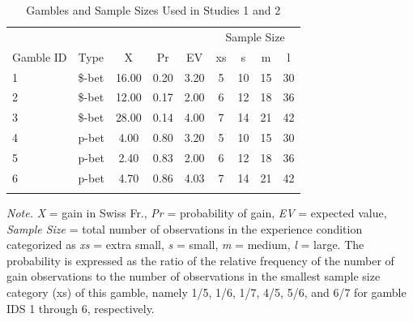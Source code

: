 \documentclass[a4paper, man, natbib, floatsintext]{apa6} %
\begin{document}

\begin{table}[bth]
\begin{center}
\begin{threeparttable}
\caption{Gambles and Sample Sizes Used in Studies 1 and 2\label{table:Lotteries}}
\begin{tabular}{llccccccc}
\toprule
 &  &  &  &  & \multicolumn{4}{c}{Sample Size} \\
\cmidrule(r){6-9}
Gamble ID & Type & X & Pr & EV & xs & s & m & l\\
\midrule
1 & \$-bet & 16.00 & 0.20 & 3.20 & 5 & 10 & 15 & 30\\
2 & \$-bet & 12.00 & 0.17 & 2.00 & 6 & 12 & 18 & 36\\
3 & \$-bet & 28.00 & 0.14 & 4.00 & 7 & 14 & 21 & 42\\
4 & p-bet & 4.00 & 0.80 & 3.20 & 5 & 10 & 15 & 30\\
5 & p-bet & 2.40 & 0.83 & 2.00 & 6 & 12 & 18 & 36\\
6 & p-bet & 4.70 & 0.86 & 4.03 & 7 & 14 & 21 & 42\\
\bottomrule
\addlinespace
\end{tabular}
\begin{tablenotes}[para]
\normalsize{\textit{Note.} \textit{X} = gain in Swiss Fr., \textit{Pr} = probability of gain, \textit{EV} = expected value, \textit{Sample Size} = total number of observations in the experience condition categorized as \textit{xs} = extra small, \textit{s} = small, \textit{m} = medium, \textit{l} = large. The probability is expressed as the ratio of the relative frequency of the number of gain observations to the number of observations in the smallest sample size category (xs) of this gamble, namely 1/5, 1/6, 1/7, 4/5, 5/6, and 6/7 for gamble IDS 1 through 6, respectively.}
\end{tablenotes}
\end{threeparttable}
\end{center}
\end{table}
\end{document}
